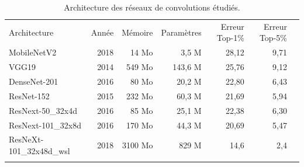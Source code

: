 \begin{table}[]
    \centering
    \begin{tabular}{|l|r|r|r|r|r|r|}
        \hhline{------}
        Architecture             & Année & Mémoire & Paramètres & Erreur Top-1\% & Erreur Top-5\% \\
        \hhline{=:=:=:=:=:=} %
        MobileNetV2              & 2018  & 14 Mo   & 3,5 M      & 28,12          & 9,71           \\ \hline
        VGG19                    & 2014  & 549 Mo  & 143,6 M    & 25,76          & 9,12           \\ \hline
        DenseNet-201             & 2016  & 80 Mo   & 20,2 M     & 22,80          & 6,43           \\ \hline
        ResNet-152               & 2015  & 232 Mo  & 60,3 M     & 21,69          & 5,94           \\ \hline
        ResNext-50\_32x4d        & 2016  & 85 Mo   & 25,1 M     & 22,38          & 6,30           \\ \hline
        ResNext-101\_32x8d       & 2016  & 170 Mo  & 44,3 M     & 20,69          & 5,47          \\ \hline
        ResNeXt-101\_32x48d\_wsl & 2018  & 3100 Mo & 829 M      & 14,6           &     2,4           \\
        \hhline{------}
    \end{tabular}
    \caption{Architecture des réseaux de convolutions étudiés.}
    \label{tab:deep_models}
\end{table}

